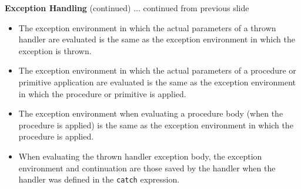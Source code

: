 \begin{minipage}[t]{\sw}
\slidenumber
\LARGE
{\bf Exception Handling} (continued)\exx
... continued from previous slide
\begin{itemize}
\parskip 0ex
\item
  The exception environment in which the actual parameters
  of a thrown handler are evaluated is the same
  as the exception environment in which the exception is thrown.
\item
  The exception environment in which the actual parameters
  of a procedure or primitive application are evaluated
  is the same as the exception environment in which
  the procedure or primitive is applied.
\item
  The exception environment when evaluating a procedure body
  (when the procedure is applied)
  is the same as the exception environment
  in which the procedure is applied.
\item
  When evaluating the thrown handler exception body,
  the exception environment and continuation are those saved
  by the handler when the handler was defined in the \verb'catch' expression.
\end{itemize}
\end{minipage}
